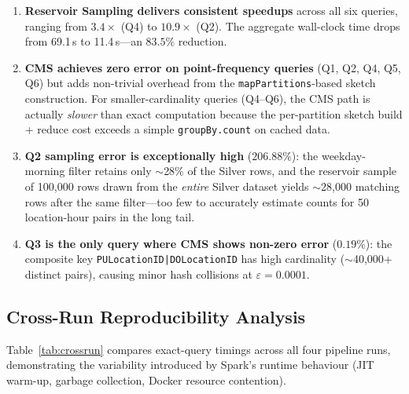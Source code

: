 \documentclass{article}
\begin{document}
\begin{enumerate}[nosep]
    \item \textbf{Reservoir Sampling delivers consistent speedups} across all six queries, ranging from $3.4\times$ (Q4) to $10.9\times$ (Q2). The aggregate wall-clock time drops from 69.1\,s to 11.4\,s—an $83.5\%$ reduction.
    \item \textbf{CMS achieves zero error on point-frequency queries} (Q1, Q2, Q4, Q5, Q6) but adds non-trivial overhead from the \texttt{mapPartitions}-based sketch construction. For smaller-cardinality queries (Q4--Q6), the CMS path is actually \emph{slower} than exact computation because the per-partition sketch build + reduce cost exceeds a simple \texttt{groupBy.count} on cached data.
    \item \textbf{Q2 sampling error is exceptionally high} ($206.88\%$): the weekday-morning filter retains only $\sim$28\% of the Silver rows, and the reservoir sample of 100{,}000 rows drawn from the \emph{entire} Silver dataset yields $\sim$28{,}000 matching rows after the same filter—too few to accurately estimate counts for 50 location-hour pairs in the long tail.
    \item \textbf{Q3 is the only query where CMS shows non-zero error} ($0.19\%$): the composite key \texttt{PULocationID|DOLocationID} has high cardinality ($\sim$40{,}000+ distinct pairs), causing minor hash collisions at $\varepsilon = 0.0001$.
\end{enumerate}

\subsection{Cross-Run Reproducibility Analysis}
\label{sec:crossrun}

Table~\ref{tab:crossrun} compares exact-query timings across all four pipeline runs, demonstrating the variability introduced by Spark's runtime behaviour (JIT warm-up, garbage collection, Docker resource contention).
\end{document}
